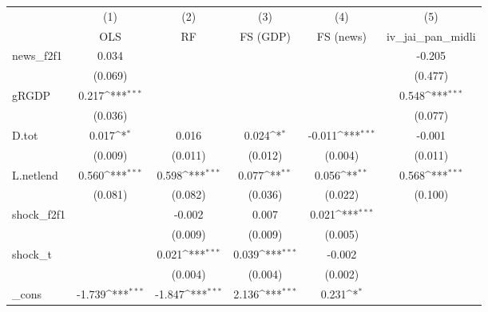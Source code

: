 {
\def\sym#1{\ifmmode^{#1}\else\(^{#1}\)\fi}
\begin{tabular}{l*{5}{c}}
\toprule
            &\multicolumn{1}{c}{(1)}&\multicolumn{1}{c}{(2)}&\multicolumn{1}{c}{(3)}&\multicolumn{1}{c}{(4)}&\multicolumn{1}{c}{(5)}\\
            &\multicolumn{1}{c}{OLS}&\multicolumn{1}{c}{RF}&\multicolumn{1}{c}{FS (GDP)}&\multicolumn{1}{c}{FS (news)}&\multicolumn{1}{c}{iv\_jai\_pan\_midli}\\
\midrule
news\_f2f1   &       0.034         &                     &                     &                     &      -0.205         \\
            &     (0.069)         &                     &                     &                     &     (0.477)         \\
\addlinespace
gRGDP       &       0.217\sym{***}&                     &                     &                     &       0.548\sym{***}\\
            &     (0.036)         &                     &                     &                     &     (0.077)         \\
\addlinespace
D.tot       &       0.017\sym{*}  &       0.016         &       0.024\sym{*}  &      -0.011\sym{***}&      -0.001         \\
            &     (0.009)         &     (0.011)         &     (0.012)         &     (0.004)         &     (0.011)         \\
\addlinespace
L.netlend   &       0.560\sym{***}&       0.598\sym{***}&       0.077\sym{**} &       0.056\sym{**} &       0.568\sym{***}\\
            &     (0.081)         &     (0.082)         &     (0.036)         &     (0.022)         &     (0.100)         \\
\addlinespace
shock\_f2f1  &                     &      -0.002         &       0.007         &       0.021\sym{***}&                     \\
            &                     &     (0.009)         &     (0.009)         &     (0.005)         &                     \\
\addlinespace
shock\_t     &                     &       0.021\sym{***}&       0.039\sym{***}&      -0.002         &                     \\
            &                     &     (0.004)         &     (0.004)         &     (0.002)         &                     \\
\addlinespace
\_cons      &      -1.739\sym{***}&      -1.847\sym{***}&       2.136\sym{***}&       0.231\sym{*}  &                     \\

\end{tabular}}
